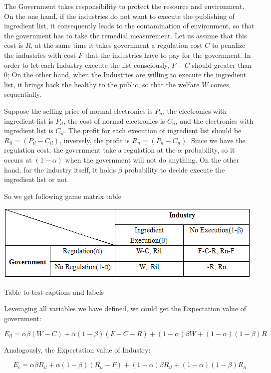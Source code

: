 The Government takes responsibility to protect the resource and environment. 
On the one hand, if the industries do not want to 
execute the publishing of ingredient list, it consequently leads to the contamination of environment, 
so that the government has to take the remedial measurement. Let us assume that this cost is $R$, 
at the same time it takes government a regulation cost $C$ to penalize the
industries with cost $F$ that the industries have to pay for the government. 
In order to let each Industry execute the list consciously, $F-C$ should greater than $0$; On the other hand, 
when the Industries are willing to execute the ingredient list, it brings back the healthy to 
the public, so that the welfare $W$ comes sequentially.

Suppose the selling price of normal electronics is $P_n$, the electronics with ingredient list is $P_{il}$,
the cost of normal electronics is $C_n$, and the electronics with ingredient list is $C_{il}$. 
The profit for each execution of ingredient list should be $R_{il} = (P_{il}-C_{il})$, inversely, 
the profit is $R_n = (P_n-C_n)$. Since we have the regulation cost, 
the government take a regulation at the $\alpha$ probability,  so it occurs at $(1-\alpha)$
when the government will not do anything. On the other hand, for the industry itself, 
it holds $\beta$ probability to decide execute the ingredient list or not.

So we get following game matrix table

\begin{center}
\begin{table}[!htbp]
\includegraphics[width=0.5\columnwidth]{figure/result.png}
\label{table:2}
\caption{Table to test captions and labels}
\end{table}
\end{center}

Leveraging all variables we have defined, we could get the Expectation value of government:

\[
E_{il} = \alpha\beta(W-C) + \alpha(1-\beta)(F-C-R) + (1-\alpha)\beta W + (1-\alpha)(1-\beta)R
\]

Analogously, the Expectation value of Industry:

\[
E_c = \alpha\beta R_{il} + \alpha(1-\beta)(R_n-F) + (1-\alpha)\beta R_{il} + (1-\alpha)(1-\beta)R_n
\]

